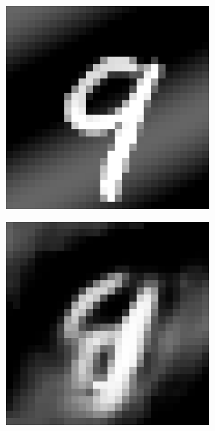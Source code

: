 \documentclass{article} %
\begin{document}
\begin{figure}
\centering
\begin{subfigure}{0.22\textwidth}
\includegraphics[width = \textwidth]{figures-MNIST/llowblur.eps}
\end{subfigure}
\hfill
\begin{subfigure}{0.22\textwidth}
\includegraphics[width = \textwidth]{figures-MNIST/llow-1.eps}

\end{subfigure}
\end{figure}
\end{document}
